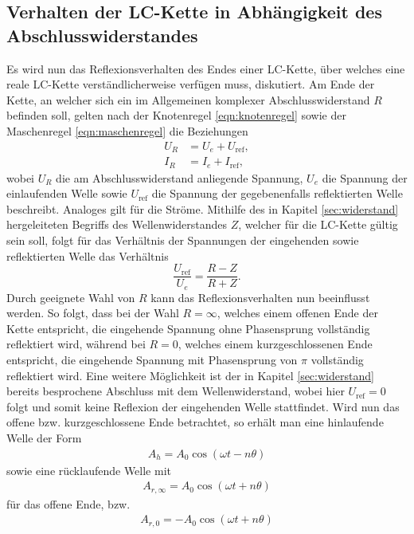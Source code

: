 \subsection{Verhalten der LC-Kette in Abhängigkeit des Abschlusswiderstandes}
\label{sec:verhalten}
Es wird nun das Reflexionsverhalten des Endes einer LC-Kette, über welches eine reale LC-Kette verständlicherweise verfügen muss, diskutiert.
Am Ende der Kette, an welcher sich ein im Allgemeinen komplexer Abschlusswiderstand $R$ befinden soll, gelten nach der Knotenregel \eqref{eqn:knotenregel} sowie der Maschenregel \eqref{eqn:maschenregel} die Beziehungen
\begin{align}
  U_R &= U_e + U_{\text{ref}}, \\
  I_R &= I_e + I_{\text{ref}},
\end{align}
wobei $U_R$ die am Abschlusswiderstand anliegende Spannung, $U_e$ die Spannung der einlaufenden Welle sowie $U_{\text{ref}}$ die Spannung der gegebenenfalls reflektierten Welle beschreibt.
Analoges gilt für die Ströme.
Mithilfe des in Kapitel \ref{sec:widerstand} hergeleiteten Begriffs des Wellenwiderstandes $Z$, welcher für die LC-Kette gültig sein soll, folgt für das Verhältnis der Spannungen der eingehenden sowie reflektierten Welle das Verhältnis
\begin{equation}
  \frac{U_{\text{ref}}}{U_e} = \frac{R - Z}{R + Z}.
\end{equation}
Durch geeignete Wahl von $R$ kann das Reflexionsverhalten nun beeinflusst werden.
So folgt, dass bei der Wahl $R=\infty$, welches einem offenen Ende der Kette entspricht, die eingehende Spannung ohne Phasensprung vollständig reflektiert wird, während bei $R=0$, welches einem kurzgeschlossenen Ende entspricht, die eingehende Spannung mit Phasensprung von $\pi$ vollständig reflektiert wird.
Eine weitere Möglichkeit ist der in Kapitel \ref{sec:widerstand} bereits besprochene Abschluss mit dem Wellenwiderstand, wobei hier $U_{\text{ref}} = 0$ folgt und somit keine Reflexion der eingehenden Welle stattfindet.
Wird nun das offene bzw. kurzgeschlossene Ende betrachtet, so erhält man eine hinlaufende Welle der Form
\begin{align*}
  A_h = A_0 \cos{(\omega t - n \theta)}
\end{align*}
sowie eine rücklaufende Welle mit
\begin{align*}
  A_{r, \infty} = A_0 \cos{(\omega t + n \theta)}
\end{align*}
für das offene Ende, bzw.
\begin{align*}
  A_{r, 0} = - A_0 \cos{(\omega t + n \theta)}
\end{align*}
